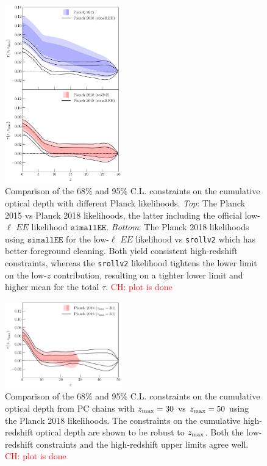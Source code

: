 \documentclass[prd,twocolumn,amsmath,amssymb,floatfix,superscriptaddress,nofootinbib]{revtex4-1}
\newcommand{\zmax}{z_{\rm max}}
\newcommand{\ch}[1]{\textcolor{red}{#1}}
\begin{document}
\begin{figure}[ht]
\includegraphics[width=0.45\textwidth]{paper/plots/pl18_taugtz_pc_zmax30_pl15_vs_pl18_simallEE_vs_pl18_srollv2.pdf}
\caption{Comparison of the 68\% and 95\% C.L. constraints on the cumulative optical depth with different Planck likelihoods. \textit{Top}: The Planck 2015 vs Planck 2018 likelihoods, the latter including the official low-$\ell$ $EE$ likelihood $\texttt{simallEE}$. \textit{Bottom}: The Planck 2018 likelihoods using $\texttt{simallEE}$ for the low-$\ell$ $EE$ likelihood vs \texttt{srollv2} which has better foreground cleaning. Both yield consistent high-redshift constraints, whereas the \texttt{srollv2} likelihood tightens the lower limit on the low-$z$ contribution, resulting on a tighter lower limit and higher mean for the total $\tau$. \ch{CH: plot is done}
}
\label{fig:plot_taugtz_2015_vs_2018_simallEE_vs_2018_srollv2}
\end{figure}


\begin{figure}[ht]
\includegraphics[width=0.45\textwidth]{paper/plots/pl18_taugtz_pl18_srollv2_pc_zmax30_vs_zmax50.pdf}
\caption{Comparison of the 68\% and 95\% C.L. constraints on the cumulative optical depth from PC chains with $\zmax = 30$ vs $\zmax = 50$ using the Planck 2018 likelihoods. The constraints on the cumulative high-redshift optical depth are shown to be robust to $\zmax$. Both the low-redshift constraints and the high-redshift upper limits agree well. \ch{CH: plot is done}
}
\label{fig:plot_taugtz_zmax30_vs_zmax50}
\end{figure}
\end{document}
